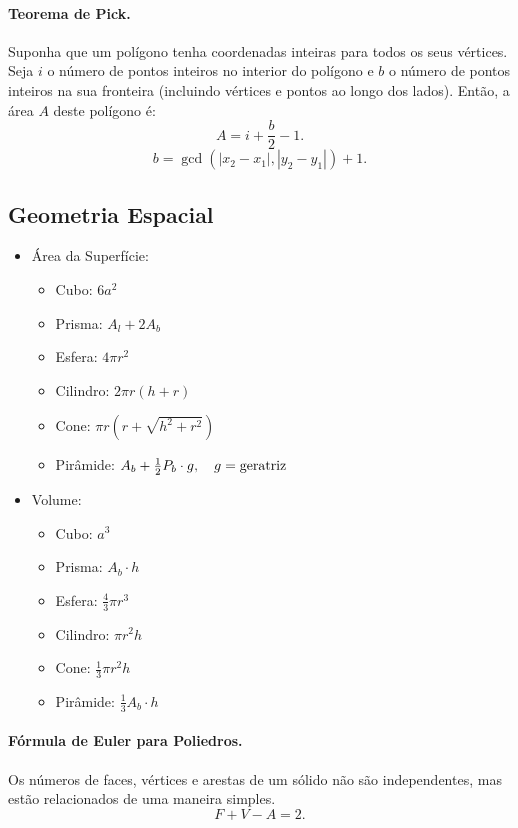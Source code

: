 \paragraph{Teorema de Pick.} Suponha que um polígono tenha coordenadas inteiras para todos os seus vértices. Seja $i$ o número de pontos inteiros no interior do polígono e $b$ o número de pontos inteiros na sua fronteira (incluindo vértices e pontos ao longo dos lados). Então, a área $A$ deste polígono é:
$$A = i + \frac{b}{2} -1.$$
$$b = \gcd(|x_2-x_1|,|y_2-y_1|)+1.$$

\subsection{Geometria Espacial}

\begin{multicols}{2}
	\begin{itemize}
		\item Área da Superfície:
		\begin{itemize}
			\item Cubo: $6a^2$
			\item Prisma: $A_l + 2A_b$
			\item Esfera: $4\pi r^2$
			\item Cilindro: $2\pi r(h+r)$
			\item Cone: $\pi r(r+\sqrt{h^2+r^2})$
			\item Pirâmide: $A_b+\frac{1}{2}P_b \cdot g, \quad g=\textnormal{geratriz}$
		\end{itemize}

		\item Volume:
		\begin{itemize}
			\item Cubo: $a^3$
			\item Prisma: $A_b\cdot h$
			\item Esfera: $\frac{4}{3} \pi r^3$
			\item Cilindro: $\pi r^2h$
			\item Cone: $\frac{1}{3} \pi r^2 h$
			\item Pirâmide: $\frac{1}{3} A_b\cdot h$
		\end{itemize}

	\end{itemize}
\end{multicols}

\paragraph{Fórmula de Euler para Poliedros.} Os números de faces, vértices e arestas de um sólido não são independentes, mas estão relacionados de uma maneira simples.
$$F + V - A = 2.$$

